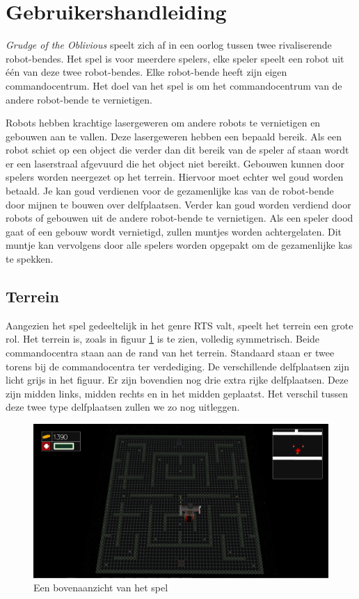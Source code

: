     \section{Gebruikershandleiding}
    \label{app:handleiding}
    \emph{Grudge of the Oblivious} speelt zich af in een oorlog tussen twee rivaliserende robot-bendes. Het spel is voor meerdere spelers, elke speler speelt een robot uit \'e\'en van deze twee robot-bendes. Elke robot-bende heeft zijn eigen commandocentrum. Het doel van het spel is om het commandocentrum van de andere robot-bende te vernietigen.

    Robots hebben krachtige lasergeweren om andere robots te vernietigen en gebouwen aan te vallen. Deze lasergeweren hebben een bepaald bereik. Als een robot schiet op een object die verder dan dit bereik van de speler af staan wordt er een laserstraal afgevuurd die het object niet bereikt. Gebouwen kunnen door spelers worden neergezet op het terrein. Hiervoor moet echter wel goud worden betaald. Je kan goud verdienen voor de gezamenlijke kas van de robot-bende door mijnen te bouwen over delfplaatsen. Verder kan goud worden verdiend door robots of gebouwen uit de andere robot-bende te vernietigen. Als een speler dood gaat of een gebouw wordt vernietigd, zullen muntjes worden achtergelaten. Dit muntje kan vervolgens door alle spelers worden opgepakt om de gezamenlijke kas te spekken.

	\subsection{Terrein}
    Aangezien het spel gedeeltelijk in het genre RTS valt, speelt het terrein een grote rol. Het terrein is, zoals in figuur \ref{fig:terrein} is te zien, volledig symmetrisch. Beide commandocentra staan aan de rand van het terrein. Standaard staan er twee torens bij de commandocentra ter verdediging. De verschillende delfplaatsen zijn licht grijs in het figuur. Er zijn bovendien nog drie extra rijke delfplaatsen. Deze zijn midden links, midden rechts en in het midden geplaatst. Het verschil tussen deze twee type delfplaatsen zullen we zo nog uitleggen.

    \begin{figure}[h]
        \centering
    	\includegraphics[width=\textwidth]{kaart.png}
	\caption{Een bovenaanzicht van het spel}
    \label{fig:terrein}
    \end{figure}

